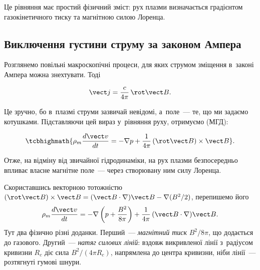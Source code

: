 Це рівняння має простий фізичний зміст: рух плазми визначається градієнтом газокінетичного
тиску та магнітною силою Лоренца.



\subsection{Виключення густини струму за законом Ампера}



Розглянемо повільні макроскопічні процеси, для яких струмом зміщення в~законі Ампера можна
знехтувати. Тоді

\begin{equation*}
    \vect j=\frac{c}{4\pi}\,\rot\vect B.
\end{equation*}

Це зручно, бо в~плазмі струми зазвичай невідомі, а~поле~--- те, що ми задаємо котушками.
Підставляючи цей вираз у~рівняння руху, отримуємо  (МГД):

\begin{equation}\label{eq:MHD-equation}
    \tcbhighmath{
    \rho_m\frac{d\vect v}{dt}
    =
    -\nabla p
    +
    \frac{1}{4\pi}\,
    (\rot\vect B)\times\vect B}.
\end{equation}

Отже, на відміну від звичайної гідродинаміки, на рух плазми безпосередньо впливає власне
магнітне поле~--- через створювану ним силу Лоренца.

Скориставшись векторною тотожністю $(\rot\vect B)\times\vect B=(\vect B\cdot\nabla)\vect
B-\nabla(B^2/2)$, перепишемо його
\begin{equation}\label{eq:MHD-pressure-tension}
	\rho_m\frac{d\vect v}{dt}=-\nabla\left(p+\frac{B^2}{8\pi}\right)+\frac1{4\pi}\,(\vect B\cdot\nabla)\vect B.
\end{equation}
Тут два фізично різні доданки. Перший~--- \emph{магнітний тиск} $B^2/8\pi$, що додається
до газового. Другий~--- \emph{натяг силових ліній}: вздовж викривленої лінії з~радіусом
кривизни $R_c$ діє сила $B^2/(4\pi R_c)$, напрямлена до центра кривизни, ніби лінії~---
розтягнуті гумові шнури.



